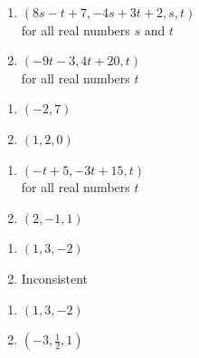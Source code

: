 \begin{multicols}{2}
\begin{enumerate}
\setcounter{enumi}{\value{HW}}


\item $(8s - t + 7, -4s + 3t + 2, s, t)$ \\ for all real numbers $s$ and $t$
\item $(-9t - 3, 4t + 20, t)$ \\ for all real numbers $t$


\setcounter{HW}{\value{enumi}}
\end{enumerate}
\end{multicols}


\begin{multicols}{2}
\begin{enumerate}
\setcounter{enumi}{\value{HW}}

\item $(-2, 7)$
\item $(1, 2, 0)$

\setcounter{HW}{\value{enumi}}
\end{enumerate}
\end{multicols}


\begin{multicols}{2}
\begin{enumerate}
\setcounter{enumi}{\value{HW}}


\item $(-t + 5, -3t + 15, t)$\\
for all real numbers $t$
\item $(2,-1,1)$


\setcounter{HW}{\value{enumi}}
\end{enumerate}
\end{multicols}


\begin{multicols}{2}
\begin{enumerate}
\setcounter{enumi}{\value{HW}}

\item $(1,3,-2)$
\item Inconsistent


\setcounter{HW}{\value{enumi}}
\end{enumerate}
\end{multicols}


\begin{multicols}{2}
\begin{enumerate}
\setcounter{enumi}{\value{HW}}


\item $(1,3,-2)$
\item $\left(-3,\frac{1}{2},1\right)$

\setcounter{HW}{\value{enumi}}
\end{enumerate}
\end{multicols}


